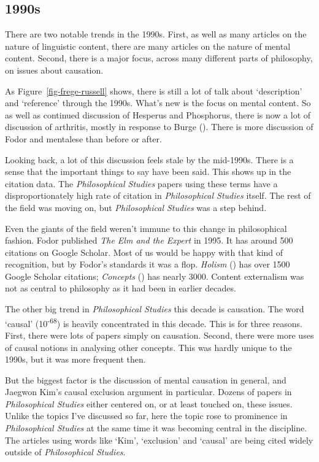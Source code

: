 \documentclass[
  10pt,
  letterpaper,
  DIV=11,
  numbers=noendperiod,
  twoside]{scrartcl}
\begin{document}
\subsection{1990s}\label{sec-1990s-articles}

There are two notable trends in the 1990s. First, as well as many
articles on the nature of linguistic content, there are many articles on
the nature of mental content. Second, there is a major focus, across
many different parts of philosophy, on issues about causation.

As Figure~\ref{fig-frege-russell} shows, there is still a lot of talk
about `description' and `reference' through the 1990s. What's new is the
focus on mental content. So as well as continued discussion of Hesperus
and Phosphorus, there is now a lot of discussion of arthritis, mostly in
response to Burge (). There is
more discussion of Fodor and mentalese than before or after.

Looking back, a lot of this discussion feels stale by the mid-1990s.
There is a sense that the important things to say have been said. This
shows up in the citation data. The \emph{Philosophical Studies} papers
using these terms have a disproportionately high rate of citation in
\emph{Philosophical Studies} itself. The rest of the field was moving
on, but \emph{Philosophical Studies} was a step behind.

Even the giants of the field weren't immune to this change in
philosophical fashion. Fodor published \emph{The Elm and the Expert} in
1995. It has around 500 citations on Google Scholar. Most of us would be
happy with that kind of recognition, but by Fodor's standards it was a
flop. \emph{Holism} () has over 1500 Google Scholar citations; \emph{Concepts}
() has nearly 3000. Content
externalism was not as central to philosophy as it had been in earlier
decades.

The other big trend in \emph{Philosophical Studies} this decade is
causation. The word `causal' (10\textsuperscript{-68}) is heavily
concentrated in this decade. This is for three reasons. First, there
were lots of papers simply on causation. Second, there were more uses of
causal notions in analysing other concepts. This was hardly unique to
the 1990s, but it was more frequent then.

But the biggest factor is the discussion of mental causation in general,
and Jaegwon Kim's causal exclusion argument in particular. Dozens of
papers in \emph{Philosophical Studies} either centered on, or at least
touched on, these issues. Unlike the topics I've discussed so far, here
the topic rose to prominence in \emph{Philosophical Studies} at the same
time it was becoming central in the discipline. The articles using words
like `Kim', `exclusion' and `causal' are being cited widely outside of
\emph{Philosophical Studies}.
\end{document}
